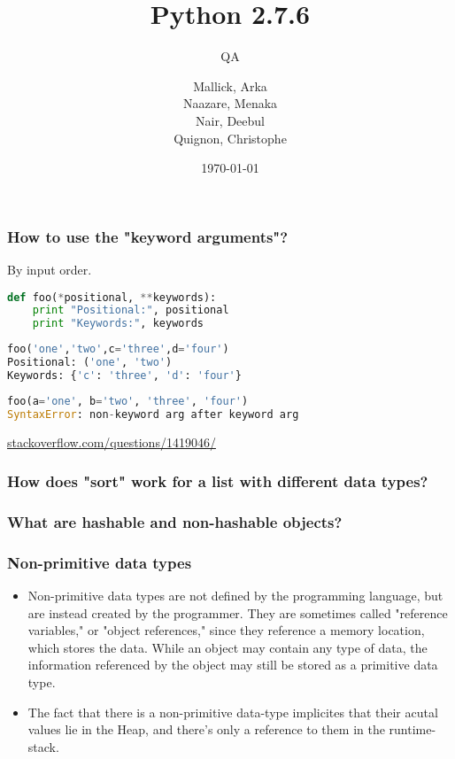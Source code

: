 \documentclass{beamer}
\begin{document}
\title{Python 2.7.6}
\subtitle{QA}
\author{
  Mallick, Arka\\
  Naazare, Menaka \\
  Nair, Deebul\\
  Quignon, Christophe \\
} 
\date{\today}

\begin{frame}
\titlepage
\end{frame}


\begin{frame}[fragile]
\frametitle{How to use the "keyword arguments"?}
By input order.
\begin{lstlisting}[language=Python]
def foo(*positional, **keywords):
    print "Positional:", positional
    print "Keywords:", keywords
\end{lstlisting}

\begin{lstlisting}[language=Python]
foo('one','two',c='three',d='four')
Positional: ('one', 'two')
Keywords: {'c': 'three', 'd': 'four'}
\end{lstlisting}
\begin{lstlisting}[language=Python]
 foo(a='one', b='two', 'three', 'four')
SyntaxError: non-keyword arg after keyword arg
\end{lstlisting}
\hbox{}
\hbox{}
\scriptsize
\hfill{}\href{http://stackoverflow.com/questions/1419046/}{stackoverflow.com/questions/1419046/}

\end{frame}


\begin{frame}[fragile]
\frametitle{How does "sort" work for a list with different data types?}

\end{frame}


\begin{frame}[fragile]
\frametitle{What are hashable and non-hashable objects?}

\end{frame}

\begin{frame}[fragile]
\frametitle{Non-primitive data types}
\begin{itemize}
	\item Non-primitive data types are not defined by the programming language, but are instead created by the programmer. They are sometimes called "reference variables," or "object references," since they reference a memory location, which stores the data. 
While an object may contain any type of data, 
the information referenced by the object may still be stored as a primitive data type.
	\item The fact that there is a non-primitive data-type implicites that their acutal values lie in the Heap, and there's only a reference to them in the runtime-stack. 
\end{itemize}
\end{frame}
\end{document}
